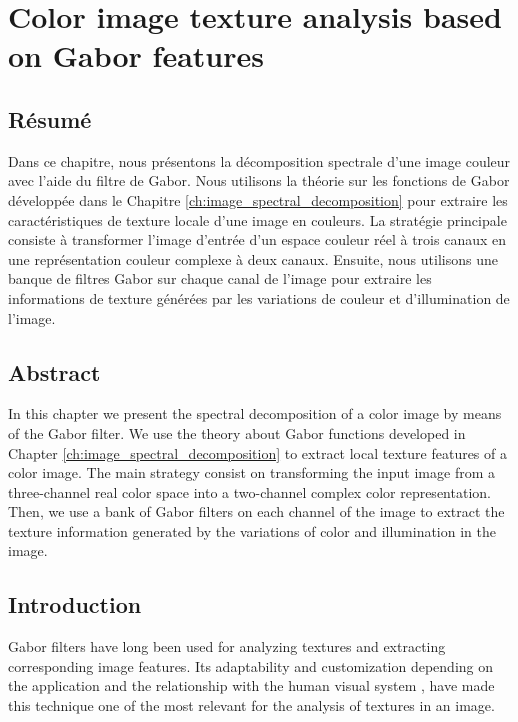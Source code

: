 
\chapter{Color image texture analysis based on Gabor features}\label{ch:complex_spectral_image_decomposition}
\section*{Résumé}
\noindent Dans ce chapitre, nous présentons la décomposition spectrale d'une image couleur avec l'aide du filtre de Gabor. Nous utilisons la théorie sur les fonctions de Gabor développée dans le Chapitre \ref{ch:image_spectral_decomposition} pour extraire les caractéristiques de texture locale d'une image en couleurs. La stratégie principale consiste à transformer l'image d'entrée d'un espace couleur réel à trois canaux en une représentation couleur complexe à deux canaux. Ensuite, nous utilisons une banque de filtres Gabor sur chaque canal de l'image pour extraire les informations de texture générées par les variations de couleur et d'illumination de l'image.

\section*{Abstract}
\noindent In this chapter we present the spectral decomposition of a color image by means of the Gabor filter. We use the theory about Gabor functions developed in Chapter \ref{ch:image_spectral_decomposition} to extract local texture features of a color image. The main strategy consist on transforming the input image from a three-channel real color space into a two-channel complex color representation. Then, we use a bank of Gabor filters on each channel of the image to extract the texture information generated by the variations of color and illumination in the image.

\section{Introduction}

Gabor filters have long been used for analyzing textures and extracting corresponding image features. Its adaptability and customization depending on the application and the relationship with the human visual system \citep{Daugman:JOSA:1985a}, have made this technique one of the most relevant for the analysis of textures in an image.

